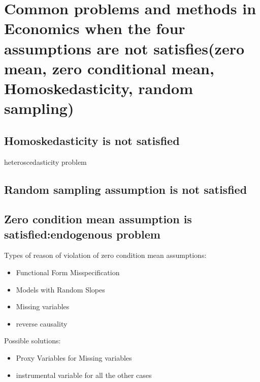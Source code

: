 \documentclass[a4paper,10pt]{article}
\begin{document}
\section{Common problems and methods in Economics when the four assumptions are not satisfies(zero mean, zero conditional mean,
Homoskedasticity, random sampling)}

\subsection{Homoskedasticity is not satisfied  \cite{dandan2013}}

heteroscedasticity problem

\subsection{Random sampling assumption is not satisfied  \cite{dandan2013}}

\subsection{Zero condition mean assumption is satisfied:endogenous problem \cite{dandan2013}}
Types of reason of violation of zero condition mean assumptions:\\
\begin{itemize}
    \item {Functional Form Misspecification}
    \item{Models with Random Slopes}
    \item{Missing variables}
    \item{reverse causality}
\end{itemize}

Possible solutions:\\
\begin{itemize}
    \item {Proxy Variables for Missing variables}
    \item{instrumental variable for all the other cases}
\end{itemize}
\end{document}
